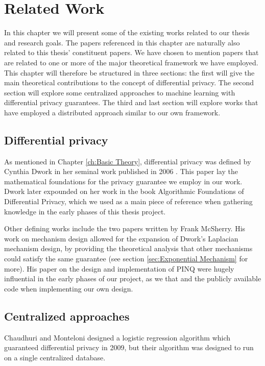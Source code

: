 
\chapter{Related Work} \label{ch:Related Work}

In this chapter we will present some of the existing works related to our thesis and research goals. The papers referenced in this chapter are naturally also related to this thesis' constituent papers. We have chosen to mention papers that are related to one or more of the major theoretical framework we have employed. This chapter will therefore be structured in three sections: the first will give the main theoretical contributions to the concept of differential privacy. The second section will explore some centralized approaches to machine learning with differential privacy guarantees. The third and last section will explore works that have employed a distributed approach similar to our own framework.   

\section{Differential privacy}
As mentioned in Chapter \ref{ch:Basic Theory}, differential privacy was defined by Cynthia Dwork in her seminal work published in 2006 \citep{Dwork06differentialprivacy}. This paper lay the mathematical foundations for the privacy guarantee we employ in our work. Dwork later expounded on her work in the book Algorithmic Foundations of Differential Privacy\citep{dwork2013algorithmic}, which we used as a main piece of reference when gathering knowledge in the early phases of this thesis project.

Other defining works include the two papers written by Frank McSherry. His work on mechanism design \citep{mcsherry2007} allowed for the expansion of Dwork's Laplacian mechanism design, by providing the theoretical analysis that other mechanisms could satisfy the same guarantee (see section \ref{sec:Exponential Mechanism} for more). His paper \citep{mcsherry2009PINQ} on the design and implementation of PINQ were hugely influential in the early phases of our project, as we that and the publicly available code when implementing our own design. 



\cite{chaudhuri2011riskMinimization}
\section{Centralized approaches}
Chaudhuri and Monteloni designed a logistic regression algorithm which guaranteed differential privacy in 2009, but their algorithm was designed to run on a single centralized database\citep{chaudhuri2009logistic}.

